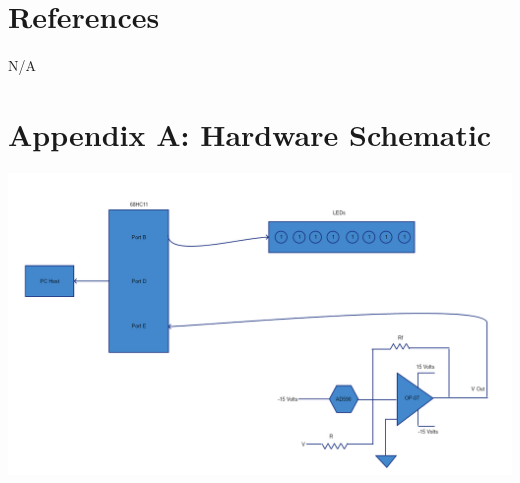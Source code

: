 \documentclass[12pt]{report}
\begin{document}
\section*{References}
	\paragraph*{}
		N/A

\section*{Appendix A: Hardware Schematic}
	\begin{center}
		\includegraphics[scale=.50]{h.PNG}
	\end{center}
\end{document}
